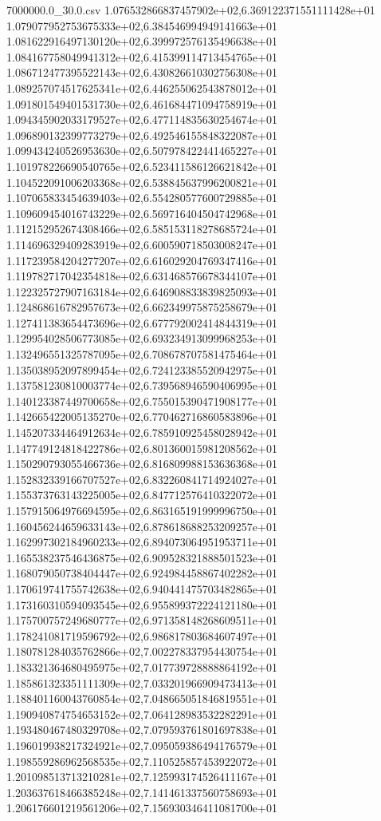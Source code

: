 \begin{filecontents*}{7000000.0_30.0.csv}
1.076532866837457902e+02,6.369122371551111428e+01
1.079077952753675333e+02,6.384546994949141663e+01
1.081622916497130120e+02,6.399972576135496638e+01
1.084167758049941312e+02,6.415399114713454765e+01
1.086712477395522143e+02,6.430826610302756308e+01
1.089257074517625341e+02,6.446255062543878012e+01
1.091801549401531730e+02,6.461684471094758919e+01
1.094345902033179527e+02,6.477114835630254674e+01
1.096890132399773279e+02,6.492546155848322087e+01
1.099434240526953630e+02,6.507978422441465227e+01
1.101978226690540765e+02,6.523411586126621842e+01
1.104522091006203368e+02,6.538845637996200821e+01
1.107065833454639403e+02,6.554280577600729885e+01
1.109609454016743229e+02,6.569716404504742968e+01
1.112152952674308466e+02,6.585153118278685724e+01
1.114696329409283919e+02,6.600590718503008247e+01
1.117239584204277207e+02,6.616029204769347416e+01
1.119782717042354818e+02,6.631468576678344107e+01
1.122325727907163184e+02,6.646908833839825093e+01
1.124868616782957673e+02,6.662349975875258679e+01
1.127411383654473696e+02,6.677792002414844319e+01
1.129954028506773085e+02,6.693234913099968253e+01
1.132496551325787095e+02,6.708678707581475464e+01
1.135038952097899454e+02,6.724123385520942975e+01
1.137581230810003774e+02,6.739568946590406995e+01
1.140123387449700658e+02,6.755015390471908177e+01
1.142665422005135270e+02,6.770462716860583896e+01
1.145207334464912634e+02,6.785910925458028942e+01
1.147749124818422786e+02,6.801360015981208562e+01
1.150290793055466736e+02,6.816809988153636368e+01
1.152832339166707527e+02,6.832260841714924027e+01
1.155373763143225005e+02,6.847712576410322072e+01
1.157915064976694595e+02,6.863165191999996750e+01
1.160456244659633143e+02,6.878618688253209257e+01
1.162997302184960233e+02,6.894073064951953711e+01
1.165538237546436875e+02,6.909528321888501523e+01
1.168079050738404447e+02,6.924984458867402282e+01
1.170619741755742638e+02,6.940441475703482865e+01
1.173160310594093545e+02,6.955899372224121180e+01
1.175700757249680777e+02,6.971358148268609511e+01
1.178241081719596792e+02,6.986817803684607497e+01
1.180781284035762866e+02,7.002278337954430754e+01
1.183321364680495975e+02,7.017739728888864192e+01
1.185861323351111309e+02,7.033201966909473413e+01
1.188401160043760854e+02,7.048665051846819551e+01
1.190940874754653152e+02,7.064128983532282291e+01
1.193480467480329708e+02,7.079593761801697838e+01
1.196019938217324921e+02,7.095059386494176579e+01
1.198559286962568535e+02,7.110525857453922072e+01
1.201098513713210281e+02,7.125993174526411167e+01
1.203637618466385248e+02,7.141461337560758693e+01
1.206176601219561206e+02,7.156930346411081700e+01

\end{filecontents*}
